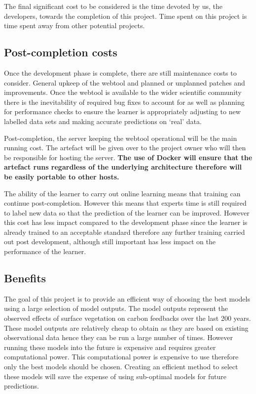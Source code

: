 \documentclass{ecmm427_assignment}
\begin{document}
The final significant cost to be considered is the time devoted by us, the developers, towards the completion of this project. Time spent on this project is time spent away from other potential projects.

\subsection{Post-completion costs}
Once the development phase is complete, there are still maintenance costs to consider. General upkeep of the webtool and planned or unplanned patches and improvements. Once the webtool is available to the wider scientific community there is the inevitability of required bug fixes to account for as well as planning for performance checks to ensure the learner is appropriately adjusting to new labelled data sets and making accurate predictions on ‘real’ data.\par

Post-completion, the server keeping the webtool operational will be the main running cost. The artefact will be given over to the project owner who will then be responsible for hosting the server. \textbf{The use of Docker will ensure that the artefact runs regardless of the underlying architecture therefore will be easily portable to other hosts.}\par

The ability of the learner to carry out online learning means that training can continue post-completion. However this means that experts time is still required to label new data so that the prediction of the learner can be improved. However this cost has less impact compared to the development phase since the learner is already trained to an acceptable standard therefore any further training carried out post development, although still important has less impact on the performance of the learner.\par

\subsection{Benefits}
The goal of this project is to provide an efficient way of choosing the best models using a large selection of model outputs. The model outputs represent the observed effects of surface vegetation on carbon feedbacks over the last 200 years. These model outputs are relatively cheap to obtain as they are based on existing observational data hence they can be run a large number of times. However running these models into the future is expensive and requires greater computational power. This computational power is expensive to use therefore only the best models should be chosen. Creating an efficient method to select these models will save the expense of using sub-optimal models for future predictions.\par
\end{document}

